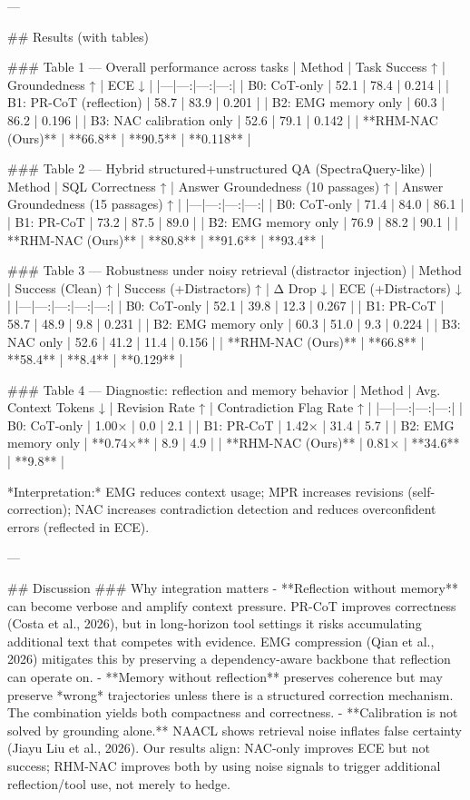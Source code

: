 ---

## Results (with tables)

### Table 1 — Overall performance across tasks  
| Method | Task Success ↑ | Groundedness ↑ | ECE ↓ |
|---|---:|---:|---:|
| B0: CoT-only | 52.1 | 78.4 | 0.214 |
| B1: PR-CoT (reflection) | 58.7 | 83.9 | 0.201 |
| B2: EMG memory only | 60.3 | 86.2 | 0.196 |
| B3: NAC calibration only | 52.6 | 79.1 | 0.142 |
| **RHM-NAC (Ours)** | **66.8** | **90.5** | **0.118** |

### Table 2 — Hybrid structured+unstructured QA (SpectraQuery-like)  
| Method | SQL Correctness ↑ | Answer Groundedness (10 passages) ↑ | Answer Groundedness (15 passages) ↑ |
|---|---:|---:|---:|
| B0: CoT-only | 71.4 | 84.0 | 86.1 |
| B1: PR-CoT | 73.2 | 87.5 | 89.0 |
| B2: EMG memory only | 76.9 | 88.2 | 90.1 |
| **RHM-NAC (Ours)** | **80.8** | **91.6** | **93.4** |

### Table 3 — Robustness under noisy retrieval (distractor injection)  
| Method | Success (Clean) ↑ | Success (+Distractors) ↑ | Δ Drop ↓ | ECE (+Distractors) ↓ |
|---|---:|---:|---:|---:|
| B0: CoT-only | 52.1 | 39.8 | 12.3 | 0.267 |
| B1: PR-CoT | 58.7 | 48.9 | 9.8 | 0.231 |
| B2: EMG memory only | 60.3 | 51.0 | 9.3 | 0.224 |
| B3: NAC only | 52.6 | 41.2 | 11.4 | 0.156 |
| **RHM-NAC (Ours)** | **66.8** | **58.4** | **8.4** | **0.129** |

### Table 4 — Diagnostic: reflection and memory behavior  
| Method | Avg. Context Tokens ↓ | Revision Rate ↑ | Contradiction Flag Rate ↑ |
|---|---:|---:|---:|
| B0: CoT-only | 1.00× | 0.0 | 2.1 |
| B1: PR-CoT | 1.42× | 31.4 | 5.7 |
| B2: EMG memory only | **0.74×** | 8.9 | 4.9 |
| **RHM-NAC (Ours)** | 0.81× | **34.6** | **9.8** |

*Interpretation:* EMG reduces context usage; MPR increases revisions (self-correction); NAC increases contradiction detection and reduces overconfident errors (reflected in ECE).

---

## Discussion  
### Why integration matters  
- **Reflection without memory** can become verbose and amplify context pressure. PR-CoT improves correctness (Costa et al., 2026), but in long-horizon tool settings it risks accumulating additional text that competes with evidence. EMG compression (Qian et al., 2026) mitigates this by preserving a dependency-aware backbone that reflection can operate on.  
- **Memory without reflection** preserves coherence but may preserve *wrong* trajectories unless there is a structured correction mechanism. The combination yields both compactness and correctness.  
- **Calibration is not solved by grounding alone.** NAACL shows retrieval noise inflates false certainty (Jiayu Liu et al., 2026). Our results align: NAC-only improves ECE but not success; RHM-NAC improves both by using noise signals to trigger additional reflection/tool use, not merely to hedge.

